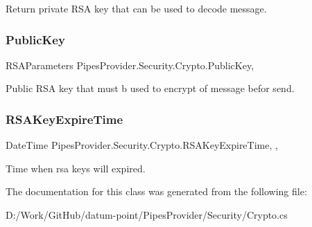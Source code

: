 Return private R\+SA key that can be used to decode message. 

\mbox{\label{class_pipes_provider_1_1_security_1_1_crypto_a1813c1f43bdb164e4e023947e0cad08c}} 
\subsubsection{\texorpdfstring{Public\+Key}{PublicKey}}
{\footnotesize\ttfamily R\+S\+A\+Parameters Pipes\+Provider.\+Security.\+Crypto.\+Public\+Key\hspace{0.3cm}{\ttfamily [static]}, {\ttfamily [get]}}



Public R\+SA key that must b used to encrypt of message befor send. 

\mbox{\label{class_pipes_provider_1_1_security_1_1_crypto_aee1d631c98ae7aff552257befa32c37d}} 
\subsubsection{\texorpdfstring{R\+S\+A\+Key\+Expire\+Time}{RSAKeyExpireTime}}
{\footnotesize\ttfamily Date\+Time Pipes\+Provider.\+Security.\+Crypto.\+R\+S\+A\+Key\+Expire\+Time\hspace{0.3cm}{\ttfamily [static]}, {\ttfamily [get]}, {}}



Time when rsa keys will expired. 



The documentation for this class was generated from the following file\+:\begin{DoxyCompactItemize}
\item 
D\+:/\+Work/\+Git\+Hub/datum-\/point/\+Pipes\+Provider/\+Security/Crypto.\+cs\end{DoxyCompactItemize}
